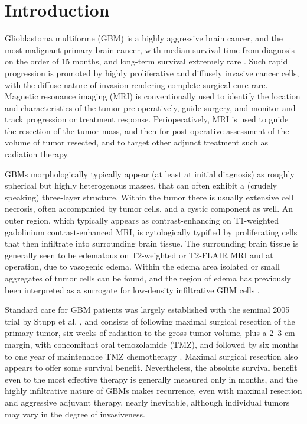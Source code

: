 \documentclass{aims}
\numberwithin{equation}{section}
\begin{document}
\section{Introduction}

Glioblastoma multiforme (GBM) is a highly aggressive brain cancer, and the most malignant primary brain cancer, with median survival time from diagnosis on the order of 15 months, and long-term survival extremely rare \cite{Norden2006}.  Such rapid progression is promoted by highly proliferative and diffusely invasive cancer cells, with the diffuse nature of invasion rendering complete surgical cure rare. Magnetic resonance imaging (MRI) is conventionally used to identify the location and characteristics of the tumor pre-operatively, guide surgery, and monitor and track progression or treatment response. Perioperatively, MRI is used to guide the resection of the tumor mass, and then for post-operative assessment of the volume of tumor resected, and to target other adjunct treatment such as radiation therapy.

GBMs morphologically typically appear (at least at initial diagnosis) as roughly spherical but highly heterogenous masses, that can often exhibit a (crudely speaking) three-layer structure.  Within the tumor there is usually extensive cell necrosis, often accompanied by tumor cells, and a cystic component as well.  An outer region, which typically appears as contrast-enhancing on T1-weighted gadolinium contrast-enhanced MRI, is cytologically typified by proliferating cells that then infiltrate into surrounding brain tissue.  The surrounding brain tissue is generally seen to be edematous on T2-weighted or T2-FLAIR MRI and at operation, due to vasogenic edema.  Within the edema area isolated or small aggregates of tumor cells can be found, and the region of edema has previously been interpreted as a surrogate for low-density infiltrative GBM cells \cite{Swanson2008}.

Standard care for GBM patients was largely established with the seminal 2005 trial by Stupp et al. \cite{Stupp2005}, and consists of following maximal surgical resection of the primary tumor, six weeks of radiation to the gross tumor volume, plus a 2--3 cm margin, with concomitant oral temozolamide (TMZ), and followed by six months to one year of maintenance TMZ chemotherapy \cite{Gilbert2013}.  Maximal surgical resection also appears to offer some survival benefit.  Nevertheless, the absolute survival benefit even to the most effective therapy is generally measured only in months, and the highly infiltrative nature of GBMs makes recurrence, even with maximal resection and aggressive adjuvant therapy, nearly inevitable, although individual tumors may vary in the degree of invasiveness.
\end{document}
